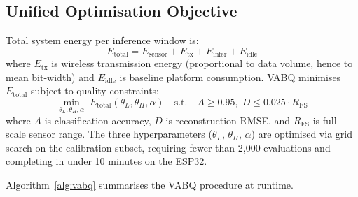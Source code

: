 \subsection{Unified Optimisation Objective}
\label{sec:meth_unified}

Total system energy per inference window is:
\begin{equation}
    E_{\text{total}} = E_{\text{sensor}} + E_{\text{tx}} + E_{\text{infer}} + E_{\text{idle}}
    \label{eq:totalenergy}
\end{equation}
where $E_{\text{tx}}$ is wireless transmission energy (proportional to data volume, hence to mean bit-width) and $E_{\text{idle}}$ is baseline platform consumption. VABQ minimises $E_{\text{total}}$ subject to quality constraints:
\begin{equation}
    \min_{\theta_L, \theta_H, \alpha} \; E_{\text{total}}(\theta_L, \theta_H, \alpha) \quad \text{s.t.} \quad A \geq 0.95, \; D \leq 0.025 \cdot R_{\text{FS}}
    \label{eq:optimization}
\end{equation}
where $A$ is classification accuracy, $D$ is reconstruction RMSE, and $R_{\text{FS}}$ is full-scale sensor range. The three hyperparameters ($\theta_L$, $\theta_H$, $\alpha$) are optimised via grid search on the calibration subset, requiring fewer than 2,000 evaluations and completing in under 10 minutes on the ESP32.

Algorithm~\ref{alg:vabq} summarises the VABQ procedure at runtime.

\begin{algorithm}[H]
\SetAlgoLined
{}
\caption{VABQ Runtime Procedure}
\label{alg:vabq}
\end{algorithm}
